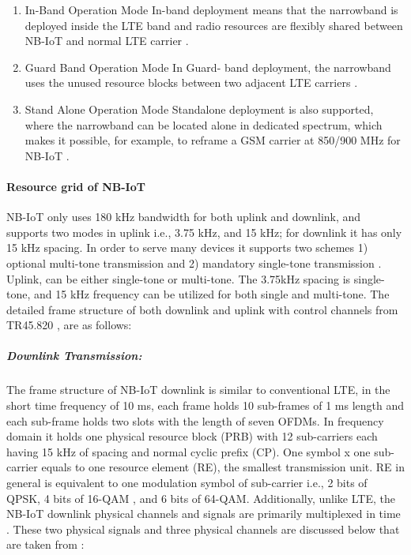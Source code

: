 \documentclass[12pt]{article}
\begin{document}
\begin{enumerate}
    \item In-Band Operation Mode\newline
    In-band deployment means that the narrowband is deployed inside the LTE band and radio resources are flexibly shared between NB-IoT and normal LTE carrier \cite{farrell2018low}.
    \item  Guard Band Operation Mode\newline
    In Guard- band deployment, the narrowband uses the unused resource blocks between two adjacent LTE carriers \cite{farrell2018low}.
    \item Stand Alone Operation Mode\newline
    Standalone deployment is also supported, where the narrowband can be located alone in dedicated spectrum, which makes it possible, for example, to reframe a GSM carrier at 850/900 MHz for NB-IoT \cite{farrell2018low}.
\end{enumerate}

\paragraph{Resource grid of NB-IoT}
NB-IoT only uses 180 kHz bandwidth for both uplink and downlink, and supports two modes in uplink i.e., 3.75 kHz, and 15 kHz; for downlink it has only 15 kHz spacing. In order to serve many devices it supports two schemes 1) optional multi-tone transmission and 2) mandatory single-tone transmission \cite{xu2017narrowband,malik2018radio}. Uplink, can be either single-tone or multi-tone. The 3.75kHz spacing is single-tone, and 15 kHz frequency can be utilized for both single and multi-tone. The detailed frame structure of both downlink and uplink with control channels from TR45.820 \cite{malik2018radio,TR45.820}, are as follows:

\subparagraph{Downlink Transmission:}
The frame structure of NB-IoT downlink is similar to conventional LTE, in the short time frequency of 10 ms, each frame holds 10 sub-frames of 1 ms length and each sub-frame holds two slots with the length of seven OFDMs. In frequency domain it holds one physical resource block (PRB) with 12 sub-carriers each having 15 kHz of spacing and normal cyclic prefix (CP). One symbol x one sub-carrier equals to one resource element (RE), the smallest transmission unit. RE in general is equivalent to one modulation symbol of sub-carrier i.e., 2 bits of QPSK, 4 bits of 16-QAM , and 6 bits of 64-QAM. Additionally, unlike LTE, the NB-IoT downlink physical channels and signals are primarily multiplexed in time \cite{malik2018radio}. These two physical signals and three physical channels are discussed below that are taken from  \cite{malik2018radio,ratasuk2016overview}:
\end{document}
